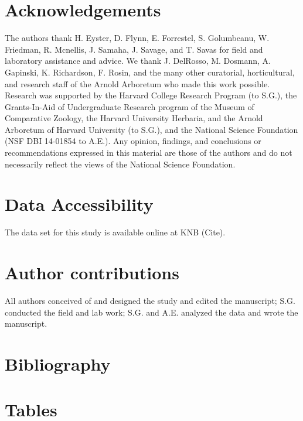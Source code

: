 \documentclass{article}
\begin{document}
\section*{Acknowledgements} %
The authors thank H. Eyster, D. Flynn, E. Forrestel, S. Golumbeanu, W. Friedman, R. Mcnellis, J. Samaha, J. Savage, and T. Savas for field and laboratory assistance and advice. We thank J. DelRosso, M. Dosmann, A. Gapinski, K. Richardson, F. Rosin, and the many other curatorial, horticultural, and research staff of the Arnold Arboretum who made this work possible. Research was supported by the Harvard College Research Program (to S.G.), the Grants-In-Aid of Undergraduate Research program of the Museum of Comparative Zoology, the Harvard University Herbaria, and the Arnold Arboretum of Harvard University (to S.G.), and the National Science Foundation (NSF DBI 14-01854 to A.E.). Any opinion, findings, and conclusions or recommendations expressed in this material are those of the authors and do not necessarily reflect the views of the National Science Foundation.

\section*{Data Accessibility}
The data set for this study is available online at KNB (Cite). 

\section*{Author contributions} All authors conceived of and designed the study and edited the manuscript; S.G. conducted the field and lab work; S.G. and A.E. analyzed the data and wrote the manuscript.

\section{Bibliography}


\section* {Tables}
\end{document}

